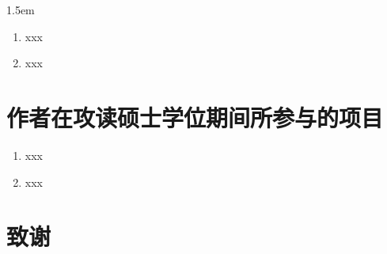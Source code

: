 \documentclass[UTF8,fontset=fandol]{ctexart}
\numberwithin{equation}{section} %
\numberwithin{table}{section} %
\begin{document}
\hangindent 1.5em
\noindent
\begin{enumerate}
    \item xxx
    \item xxx
\end{enumerate}


\pagebreak
\section*{作者在攻读硕士学位期间所参与的项目}

\begin{enumerate}
    \item xxx
    \item xxx
\end{enumerate}

\pagebreak
\section*{致谢}
\end{document}
